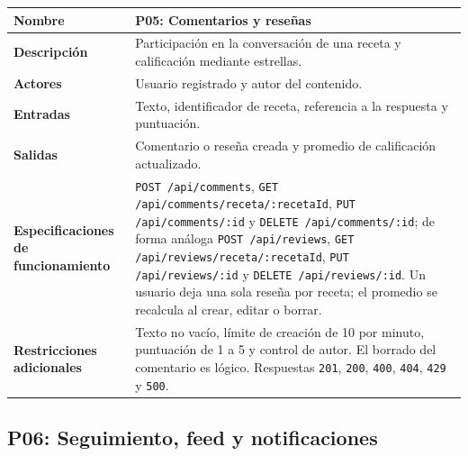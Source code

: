 \documentclass[doc,12pt,a4paper]{apa7}
\begin{document}
\begin{longtable}{|P{3.3cm}|L{11.2cm}|}
\hline
\textbf{Nombre} & P05: Comentarios y reseñas \\ \hline
\textbf{Descripción} & Participación en la conversación de una receta y calificación mediante estrellas. \\ \hline
\textbf{Actores} & Usuario registrado y autor del contenido. \\ \hline
\textbf{Entradas} & Texto, identificador de receta, referencia a la respuesta y puntuación. \\ \hline
\textbf{Salidas} & Comentario o reseña creada y promedio de calificación actualizado. \\ \hline
\textbf{Especificaciones de funcionamiento} & \texttt{POST /api/comments}, \texttt{GET /api/comments/receta/:recetaId}, \texttt{PUT /api/comments/:id} y \texttt{DELETE /api/comments/:id}; de forma análoga \texttt{POST /api/reviews}, \texttt{GET /api/reviews/receta/:recetaId}, \texttt{PUT /api/reviews/:id} y \texttt{DELETE /api/reviews/:id}. Un usuario deja una sola reseña por receta; el promedio se recalcula al crear, editar o borrar. \\ \hline
\textbf{Restricciones adicionales} & Texto no vacío, límite de creación de 10 por minuto, puntuación de 1 a 5 y control de autor. El borrado del comentario es lógico. Respuestas \texttt{201}, \texttt{200}, \texttt{400}, \texttt{404}, \texttt{429} y \texttt{500}. \\ \hline
\end{longtable}

\subsection{P06: Seguimiento, feed y notificaciones}
\end{document}
